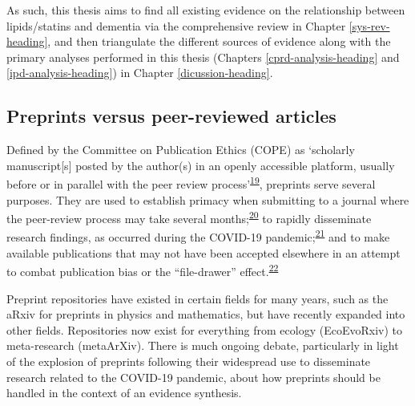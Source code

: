 \documentclass[a4paper, twoside]{templates/ociamthesis}
\begin{document}
As such, this thesis aims to find all existing evidence on the relationship between lipids/statins and dementia via the comprehensive review in Chapter \ref{sys-rev-heading}, and then triangulate the different sources of evidence along with the primary analyses performed in this thesis (Chapters \ref{cprd-analysis-heading} and \ref{ipd-analysis-heading}) in Chapter \ref{dicussion-heading}.

\hypertarget{diverse-sources-preprints}{%
\subsection{Preprints versus peer-reviewed articles}\label{diverse-sources-preprints}}

Defined by the Committee on Publication Ethics (COPE) as `scholarly manuscript{[}s{]} posted by the author(s) in an openly accessible platform, usually before or in parallel with the peer review process'\textsuperscript{\protect\hyperlink{ref-committeeonpublicationethicscope2018}{19}}, preprints serve several purposes. They are used to establish primacy when submitting to a journal where the peer-review process may take several months;\textsuperscript{\protect\hyperlink{ref-vale2016}{20}} to rapidly disseminate research findings, as occurred during the COVID-19 pandemic;\textsuperscript{\protect\hyperlink{ref-fraser2020a}{21}} and to make available publications that may not have been accepted elsewhere in an attempt to combat publication bias or the ``file-drawer'' effect.\textsuperscript{\protect\hyperlink{ref-rosenthal1979}{22}}

Preprint repositories have existed in certain fields for many years, such as the aRxiv for preprints in physics and mathematics, but have recently expanded into other fields. Repositories now exist for everything from ecology (EcoEvoRxiv) to meta-research (metaArXiv). There is much ongoing debate, particularly in light of the explosion of preprints following their widespread use to disseminate research related to the COVID-19 pandemic, about how preprints should be handled in the context of an evidence synthesis.
\end{document}

